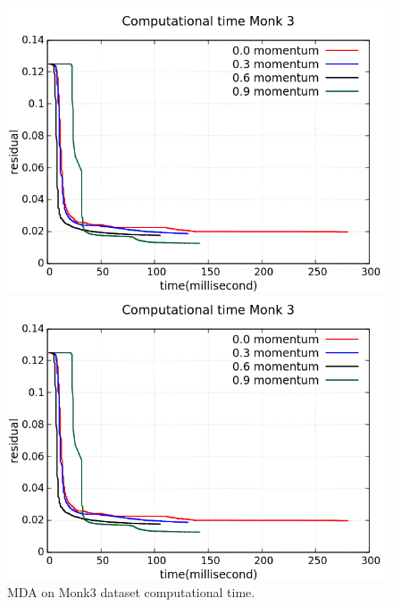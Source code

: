 \begin{figure}[H]
	\centering
	\begin{minipage}[t]{0.5\linewidth}
		\includegraphics[width=\linewidth]{data/MGD/Monk3/M/Monk3_MGD_CT_standard.png}
	\end{minipage}%
	\begin{minipage}[t]{0.5\linewidth}
		\includegraphics[width=\linewidth]{data/MGD/Monk3/M/Monk3_MGD_CT_zoom.png}
	\end{minipage}
	\caption{MDA on Monk3 dataset computational time.}
\end{figure}
